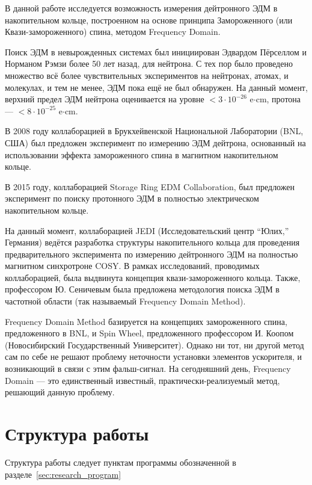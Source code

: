 \documentclass{report}
\begin{document}
В данной работе исследуется возможность измерения дейтронного ЭДМ в накопительном кольце, построенном на основе принципа Замороженного (или Квази-замороженного) спина, методом Frequency Domain.

Поиск ЭДМ в невырожденных системах был инициирован Эдвардом Пёрселлом и Норманом Рэмзи более 50 лет назад, для нейтрона. С тех пор было проведено множество всё более чувствительных экспериментов на нейтронах, атомах, и молекулах, и тем не менее, ЭДМ пока ещё не был обнаружен. На данный момент, верхний предел ЭДМ нейтрона оценивается на уровне $<3\cdot 10^{-26}$ e$\cdot$cm, протона --- $<8\cdot 10^{-25}$ e$\cdot$cm.~\cite{Pretz_presentation}

В 2008 году коллаборацией в Брукхейвенской Национальной Лаборатории (BNL, США) был предложен эксперимент по измерению ЭДМ дейтрона, основанный на использовании эффекта замороженного спина в магнитном накопительном кольце.~\cite{BNL} 

В 2015 году, коллаборацией Storage Ring EDM Collaboration, был предложен эксперимент по поиску протонного ЭДМ в полностью электрическом накопительном кольце.~\cite{Proton_EDM}

На данный момент, коллаборацией JEDI (Исследовательский центр ``Юлих,'' Германия) ведётся разработка структуры накопительного кольца для проведения предварительного эксперимента по измерению дейтронного ЭДМ на полностью магнитном синхротроне COSY. В рамках исследований, проводимых коллаборацией, была выдвинута концепция квази-замороженного кольца. Также, профессором Ю. Сеничевым была предложена методология поиска ЭДМ в частотной области (так называемый Frequency Domain Method).

Frequency Domain Method базируется на концепциях замороженного спина, предложенного в BNL, и Spin Wheel, предложенного профессором И. Коопом (Новосибирский Государственный Университет). Однако ни тот, ни другой метод сам по себе не решают проблему неточности установки элементов ускорителя, и возникающий в связи с этим фальш-сигнал.  На сегодняшний день, Frequency Domain --- это единственный известный, практически-реализуемый метод, решающий данную проблему.

\section{Структура работы}
Структура работы следует пунктам программы обозначенной в разделе~\ref{sec:research_program}
\end{document}
